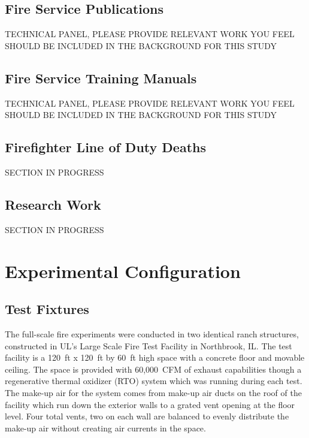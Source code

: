 \documentclass[12pt,oneside]{book}
\begin{document}
\section{Fire Service Publications}

TECHNICAL PANEL, PLEASE PROVIDE RELEVANT WORK YOU FEEL SHOULD BE INCLUDED IN THE BACKGROUND FOR THIS STUDY

\section{Fire Service Training Manuals}

TECHNICAL PANEL, PLEASE PROVIDE RELEVANT WORK YOU FEEL SHOULD BE INCLUDED IN THE BACKGROUND FOR THIS STUDY

\section{Firefighter Line of Duty Deaths}

SECTION IN PROGRESS

\section{Research Work}

SECTION IN PROGRESS

\clearpage

\chapter{Experimental Configuration}
\label{chap:exp_config}

\section{Test Fixtures}

The full-scale fire experiments were conducted in two identical ranch structures, constructed in UL's Large Scale Fire Test Facility in Northbrook, IL. The test facility is a 120~ft x 120~ft by 60~ft high space with a concrete floor and movable ceiling. The space is provided with 60,000~CFM of exhaust capabilities though a regenerative thermal oxidizer (RTO) system which was running during each test. The make-up air for the system comes from make-up air ducts on the roof of the facility which run down the exterior walls to a grated vent opening at the floor level. Four total vents, two on each wall are balanced to evenly distribute the make-up air without creating air currents in the space. 
\end{document}
